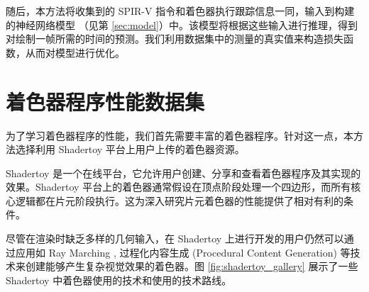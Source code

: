 随后，本方法将收集到的 SPIR-V 指令和着色器执行跟踪信息一同，输入到构建的神经网络模型 （见第 \ref{sec:model}）中。该模型将根据这些输入进行推理，得到对绘制一帧所需的时间的预测。我们利用数据集中的测量的真实值来构造损失函数，从而对模型进行优化。


\section{着色器程序性能数据集}

\label{sec:dataset}


为了学习着色器程序的性能，我们首先需要丰富的着色器程序。针对这一点，本方法选择利用 Shadertoy \cite{Shadertoy} 平台上用户上传的着色器资源。

Shadertoy 是一个在线平台，它允许用户创建、分享和查看着色器程序及其实现的效果。Shadertoy 平台上的着色器通常假设在顶点阶段处理一个四边形，而所有核心逻辑都在片元阶段执行。这为深入研究片元着色器的性能提供了相对有利的条件。

尽管在渲染时缺乏多样的几何输入，在 Shadertoy 上进行开发的用户仍然可以通过应用如 Ray Marching \cite{Hart1996}, 过程化内容生成 (Procedural Content Generation) 等技术来创建能够产生复杂视觉效果的着色器。图 \ref{fig:shadertoy_gallery} 展示了一些 Shadertoy 中着色器使用的技术和使用的技术路线。

